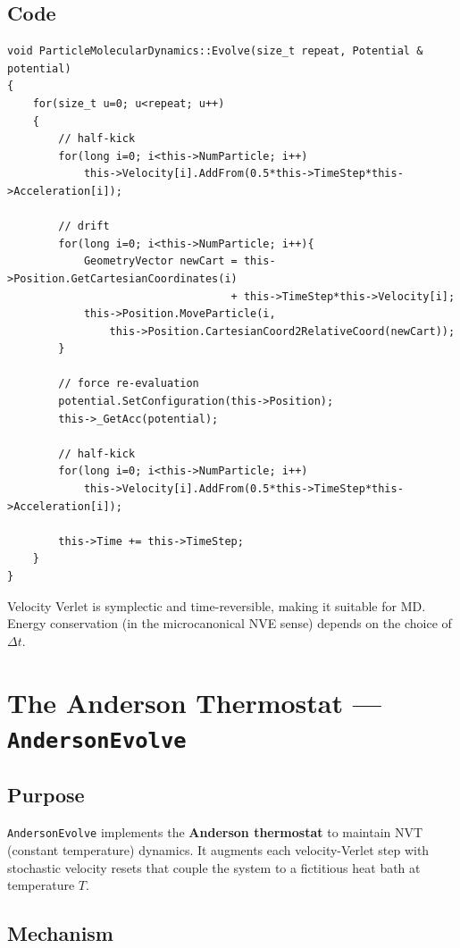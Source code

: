 \documentclass[12pt,a4paper]{article}
\begin{document}
\subsection{Code}
\begin{lstlisting}
void ParticleMolecularDynamics::Evolve(size_t repeat, Potential & potential)
{
    for(size_t u=0; u<repeat; u++)
    {
        // half-kick
        for(long i=0; i<this->NumParticle; i++)
            this->Velocity[i].AddFrom(0.5*this->TimeStep*this->Acceleration[i]);

        // drift
        for(long i=0; i<this->NumParticle; i++){
            GeometryVector newCart = this->Position.GetCartesianCoordinates(i)
                                   + this->TimeStep*this->Velocity[i];
            this->Position.MoveParticle(i,
                this->Position.CartesianCoord2RelativeCoord(newCart));
        }

        // force re-evaluation
        potential.SetConfiguration(this->Position);
        this->_GetAcc(potential);

        // half-kick
        for(long i=0; i<this->NumParticle; i++)
            this->Velocity[i].AddFrom(0.5*this->TimeStep*this->Acceleration[i]);

        this->Time += this->TimeStep;
    }
}
\end{lstlisting}

Velocity Verlet is symplectic and time-reversible, making it suitable for
MD. Energy conservation (in the microcanonical NVE sense) depends on the
choice of $\Delta t$.

\section{The Anderson Thermostat --- \texttt{AndersonEvolve}}

\subsection{Purpose}

\texttt{AndersonEvolve} implements the \textbf{Anderson thermostat} to
maintain NVT (constant temperature) dynamics. It augments each velocity-Verlet
step with stochastic velocity resets that couple the system to a fictitious
heat bath at temperature $T$.

\subsection{Mechanism}
\end{document}
